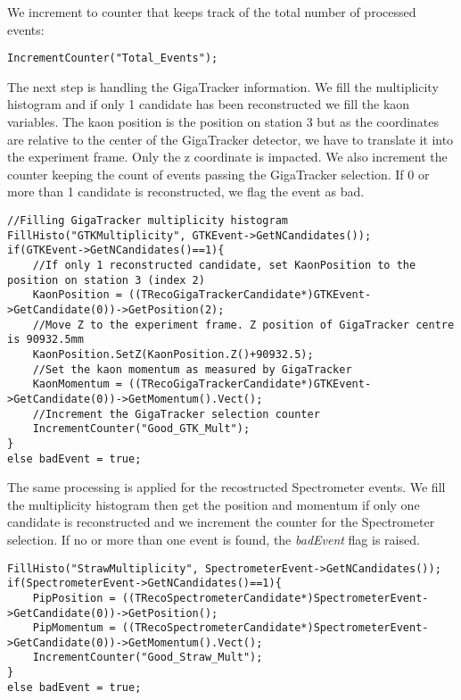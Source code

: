 \documentclass{article}
\newcommand{\var}[1]{\textit{#1}}
\begin{document}
We increment to counter that keeps track of the total number of processed events:
\begin{lstlisting}
IncrementCounter("Total_Events");
\end{lstlisting}

The next step is handling the GigaTracker information. We fill the multiplicity histogram
and if only 1 candidate has been reconstructed we fill the kaon variables. The kaon position is the
position on station 3 but as the coordinates are relative to the center of the GigaTracker detector,
we have to translate it into the experiment frame. Only the z coordinate is impacted. We also
increment the counter keeping the count of events passing the GigaTracker selection. If 0 or more
than 1 candidate is reconstructed, we flag the event as bad.

\begin{lstlisting}
//Filling GigaTracker multiplicity histogram
FillHisto("GTKMultiplicity", GTKEvent->GetNCandidates());
if(GTKEvent->GetNCandidates()==1){
	//If only 1 reconstructed candidate, set KaonPosition to the position on station 3 (index 2)
	KaonPosition = ((TRecoGigaTrackerCandidate*)GTKEvent->GetCandidate(0))->GetPosition(2);
	//Move Z to the experiment frame. Z position of GigaTracker centre is 90932.5mm  
	KaonPosition.SetZ(KaonPosition.Z()+90932.5);
	//Set the kaon momentum as measured by GigaTracker
	KaonMomentum = ((TRecoGigaTrackerCandidate*)GTKEvent->GetCandidate(0))->GetMomentum().Vect();
	//Increment the GigaTracker selection counter
	IncrementCounter("Good_GTK_Mult");
}
else badEvent = true;
\end{lstlisting}

The same processing is applied for the recostructed Spectrometer events. We fill the multiplicity
histogram then get the position and momentum if only one candidate is reconstructed and we increment
the counter for the Spectrometer selection. If no or more than one event is found, the
\var{badEvent} flag is raised.

\begin{lstlisting}
FillHisto("StrawMultiplicity", SpectrometerEvent->GetNCandidates());
if(SpectrometerEvent->GetNCandidates()==1){
	PipPosition = ((TRecoSpectrometerCandidate*)SpectrometerEvent->GetCandidate(0))->GetPosition();
	PipMomentum = ((TRecoSpectrometerCandidate*)SpectrometerEvent->GetCandidate(0))->GetMomentum().Vect();
	IncrementCounter("Good_Straw_Mult");
}
else badEvent = true;
\end{lstlisting}
\end{document}
